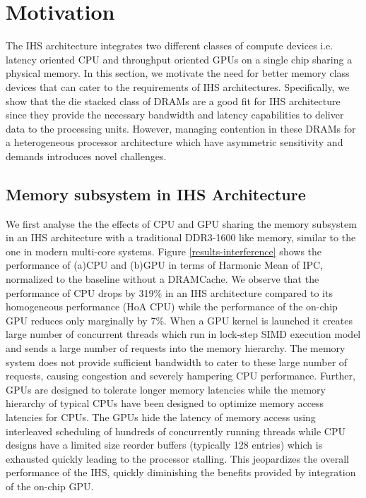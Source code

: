\section{Motivation} \label{motivation}
The IHS architecture integrates two different classes of compute devices i.e. latency oriented CPU and throughput oriented GPUs on a single chip sharing a physical memory. In this section, we motivate the need for better memory class devices that can cater to the requirements of IHS architectures. Specifically, we show that the die stacked class of DRAMs are a good fit for IHS architecture since they provide the necessary bandwidth and latency capabilities to deliver data to the processing units. However, managing contention in these DRAMs for a heterogeneous processor architecture which have asymmetric sensitivity and demands introduces novel challenges.

\subsection{Memory subsystem in IHS Architecture}
We first analyse the the effects of CPU and GPU sharing the memory subsystem in an IHS architecture with a traditional DDR3-1600 like memory, similar to the one in modern multi-core systems. Figure \ref{results-interference} shows the performance of (a)CPU and (b)GPU in terms of Harmonic Mean of IPC, normalized to the baseline without a DRAMCache. We observe that the performance of CPU drops by 319\% in an IHS architecture compared to its homogeneous performance (HoA CPU) while the performance of the on-chip GPU reduces only marginally by 7\%. When a GPU kernel is launched it creates large number of concurrent threads which run in lock-step SIMD execution model and sends a large number of requests into the memory hierarchy. The memory system does not provide sufficient bandwidth to cater to these large number of requests, causing congestion and severely hampering CPU performance. Further, GPUs are designed to tolerate longer memory latencies while the memory hierarchy of typical CPUs have been designed to optimize memory access latencies for CPUs. The GPUs hide the latency of memory access using interleaved scheduling of hundreds of concurrently running threads while CPU designs have a limited size reorder buffers (typically 128 entries) which is exhausted quickly leading to the processor stalling. This jeopardizes the overall performance of the IHS, quickly diminishing the benefits provided by integration of the on-chip GPU.

